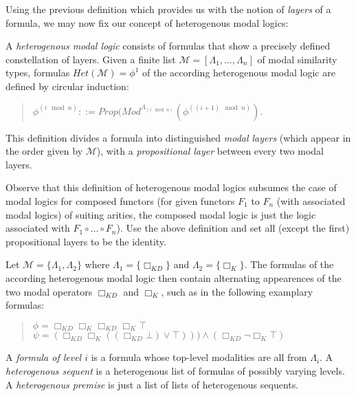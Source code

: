 \documentclass{entcs} \usepackage{entcsmacro}
\begin{document}
Using the previous definition which provides us with the notion of \emph{layers} of a formula,
we may now fix our concept of heterogenous modal logics:

\begin{definition}
A \emph{heterogenous modal logic} consists of formulas that show a precisely defined constellation
of layers. Given a finite list $\mathcal{M}=[\Lambda_1,\ldots,\Lambda_n]$ of modal similarity
types, formulas $Het(\mathcal{M})=\phi^1$ of the according heterogenous modal logic are defined by circular induction:
\begin{quote}
$\phi^{(i \mod n)}::=Prop(Mod^{\Lambda_{(i\mod n)}}(\phi^{((i+1) \mod n)}).$
\end{quote}
\end{definition}
This definition divides a formula into distinguished \emph{modal layers} (which appear in the
order given by $\mathcal{M}$), with a
\emph{propositional layer} between every two modal layers.
\begin{remark}
Observe that this definition of heterogenous modal logics subsumes the case of modal logics
for composed functors (for given functors $F_1$ to $F_n$ (with associated modal logics)
of suiting arities, the composed modal logic is just the logic associated with
$F_1\circ\ldots\circ F_n$).
Use the above definition and set all (except the first) propositional layers to be the
identity.
\end{remark}

\begin{example}
Let $\mathcal{M}=\{\Lambda_1,\Lambda_2\}$ where $\Lambda_1=\{\Box_{KD}\}$ and
$\Lambda_2=\{\Box_{K}\}$. The formulas of the according heterogenous modal logic
then contain alternating appearences of the two modal operators $\Box_{KD}$ and
$\Box_{K}$, such as in the following examplary formulas:
\begin{quote}
$\phi=\Box_{KD}\Box_{K}\Box_{KD}\Box_{K}\top$\\
$\psi=(\Box_{KD} \Box_{K} ((\Box_{KD} \bot) \vee \top)))\wedge(\Box_{KD}\neg \Box_{K} \top)$
\end{quote}
\end{example}

\begin{definition}
A \emph{formula of level $i$} is a formula whose top-level modalities are all from $\Lambda_i$.
A \emph{heterogenous sequent} is a heterogenous list of formulas of possibly varying levels. 
A \emph{heterogenous premise} is just a list of lists of heterogenous sequents.
\end{definition}
\end{document}
